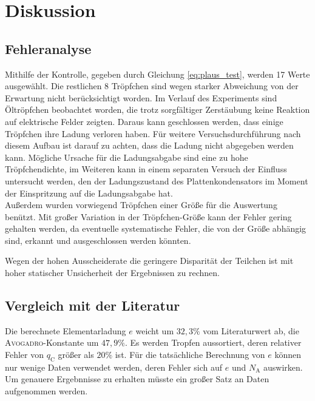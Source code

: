 \section{Diskussion}
\label{sec:Diskussion}

\subsection{Fehleranalyse}
Mithilfe der Kontrolle, gegeben durch Gleichung \eqref{eq:plaus_test}, werden 17 Werte ausgewählt.
Die restlichen 8 Tröpfchen sind wegen starker Abweichung von der Erwartung nicht berücksichtigt worden.
Im Verlauf des Experiments sind Öltröpfchen beobachtet worden, die trotz sorgfältiger Zerstäubung keine Reaktion auf elektrische Felder zeigten. 
Daraus kann geschlossen werden, dass einige Tröpfchen ihre Ladung verloren haben.
Für weitere Versuchsdurchführung nach diesem Aufbau ist darauf zu achten, dass die Ladung nicht abgegeben werden kann.
Mögliche Ursache für die Ladungsabgabe sind eine zu hohe Tröpfchendichte,
im Weiteren kann in einem separaten Versuch der Einfluss untersucht werden, 
den der Ladungszustand des Plattenkondensators im Moment der Einspritzung auf die Ladungsabgabe hat.\\
Außerdem wurden vorwiegend Tröpfchen einer Größe für die Auswertung benützt.
Mit großer Variation in der Tröpfchen-Größe kann der Fehler gering gehalten werden, da eventuelle systematische Fehler, die von der Größe abhängig sind, erkannt und ausgeschlossen werden könnten.

Wegen der hohen Ausscheiderate die geringere Disparität der Teilchen ist mit hoher statischer Unsicherheit der Ergebnissen zu rechnen.

\subsection{Vergleich mit der Literatur}
Die berechnete Elementarladung $e$ weicht um $32,3\%$ vom Literaturwert ab, die \textsc{Avogadro}-Konstante um $47,9\%$. 
Es werden Tropfen aussortiert, deren relativer Fehler von $q_\mathup{C}$ größer als $20\%$ ist. Für die tatsächliche Berechnung von $e$ können nur wenige Daten verwendet werden, deren Fehler sich auf $e$ und $N_\mathup{A}$ auswirken. Um genauere Ergebnnisse zu erhalten müsste ein großer Satz an Daten aufgenommen werden. 
